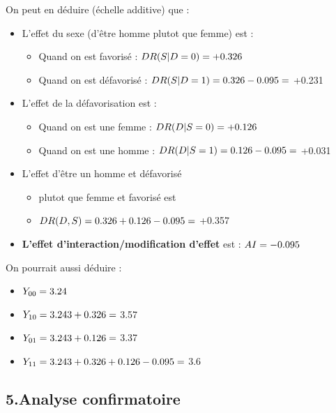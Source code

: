 \documentclass[
]{book}
\providecommand{\tightlist}{%
  \setlength{\itemsep}{0pt}\setlength{\parskip}{0pt}}
\begin{document}
On peut en déduire (échelle additive) que :

\begin{itemize}
\tightlist
\item
  L'effet du sexe (d'être homme plutot que femme) est :

  \begin{itemize}
  \tightlist
  \item
    Quand on est favorisé : \(\small DR(S|D=0) = +0.326\)
  \item
    Quand on est défavorisé : \(\small DR(S|D=1) = 0.326 - 0.095 =\) +0.231
  \end{itemize}
\item
  L'effet de la défavorisation est :

  \begin{itemize}
  \tightlist
  \item
    Quand on est une femme : \(\small DR(D|S=0) = +0.126\)
  \item
    Quand on est une homme : \(\small DR(D|S=1) = 0.126 - 0.095 =\) +0.031
  \end{itemize}
\item
  L'effet d'être un homme et défavorisé

  \begin{itemize}
  \tightlist
  \item
    plutot que femme et favorisé est
  \item
    \(\small DR(D,S) = 0.326 + 0.126 - 0.095 =\) +0.357
  \end{itemize}
\item
  \textbf{L'effet d'interaction/modification d'effet} est : \(\small AI = -0.095\)
\end{itemize}

On pourrait aussi déduire :

\begin{itemize}
\tightlist
\item
  \(\small Y_{00} = 3.24\)
\item
  \(\small Y_{10} = 3.243 + 0.326 =\) 3.57
\item
  \(\small Y_{01} = 3.243 + 0.126 =\) 3.37
\item
  \(\small Y_{11} = 3.243 + 0.326 + 0.126 - 0.095 =\) 3.6
\end{itemize}

\hypertarget{analyse-confirmatoire}{%
\subsection*{5.Analyse confirmatoire}\label{analyse-confirmatoire}}
\end{document}
